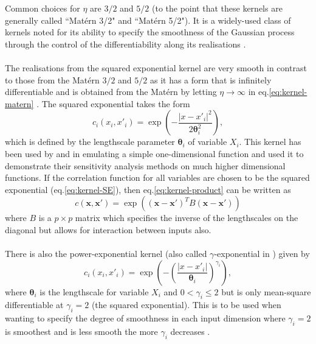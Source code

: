 \documentclass{article}
\newcommand{\numInputs}{p}
\newcommand{\inputVec}{\mathbf{x}}
\newcommand{\inputVal}{x}
\newcommand{\corr}{c}
\newcommand{\corrXi}{c_i}
\newcommand{\lengthscale}{\mathbf{\theta}}
\newcommand{\inputVariable}{X}
\begin{document}
Common choices for $\eta$ are $3/2$ and $5/2$ \citep{Tripathy2016,Despotovic2020,Tuo2020} (to the point that these kernels are generally called ``Mat{\'e}rn 3/2" and ``Mat{\'e}rn 5/2"). %
It is a widely-used class of kernels noted for its ability to specify the smoothness of the Gaussian process through the control of the differentiability along its realisations \citep{Borovitskiy2020}.\\\\
The realisations from the squared exponential kernel are very smooth in contrast to those from the Mat{\'e}rn $3/2$ and $5/2$ as it has a form that is infinitely differentiable and is obtained from the Mat{\'e}rn by letting $\eta \rightarrow \infty$ in eq.\eqref{eq:kernel-matern} \citep{Rasmussen_Williams_2006}. The squared exponential takes the form
\begin{equation}
    \label{eq:kernel-SE}
    \corrXi(\inputVal_i,\inputVal'_i) = \exp{\left(-\frac{|\inputVal - \inputVal'_i| ^2}{2 \lengthscale_i^2} \right)},
\end{equation}
which is defined by the lengthscale parameter $\lengthscale_i$ of variable $\inputVariable_i$. This kernel has been used by \citet{OHagan2006} and \citet{Oakley2002} in emulating a simple one-dimensional function and \citet{Oakley2004} used it to demonstrate their sensitivity analysis methods on much higher dimensional functions. If the correlation function for all variables are chosen to be the squared exponential (eq.\eqref{eq:kernel-SE}), then eq.\eqref{eq:kernel-product} can be written as
\begin{equation}
    \nonumber
    \corr(\inputVec,\inputVec') = \exp{\left((\inputVec - \inputVec')^T B (\inputVec - \inputVec') \right)}
\end{equation}
where $B$ is a $\numInputs \times \numInputs$ matrix which specifies the inverse of the lengthscales on the diagonal but allows for interaction between inputs also.\\\\
There is also the power-exponential kernel \citep{Higdon2008} (also called $\gamma$-exponential in \citet{Rasmussen_Williams_2006}) given by
\begin{equation}
    \nonumber
    \corrXi(\inputVal_i,\inputVal'_i) = \exp{\left(-\left(\frac{|\inputVal - \inputVal'_i|}{\lengthscale_i}\right)^{\gamma_i} \right)},
\end{equation}
where $\lengthscale_i$ is the lengthscale for variable $\inputVariable_i$ and $0 < \gamma_i \leq 2$ but is only mean-square differentiable at $\gamma_i = 2$ (the squared exponential). This is to be used when wanting to specify the degree of smoothness in each input dimension where $\gamma_i = 2$ is smoothest and is less smooth the more $\gamma_i$ decreases \citep{Rasmussen_Williams_2006}.
\end{document}
